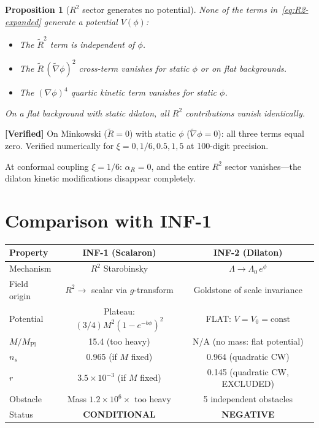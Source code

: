 \documentclass[11pt,a4paper]{article}
\theoremstyle{plain}
\newtheorem{proposition}[theorem]{Proposition}
\theoremstyle{definition}
\newcommand{\verified}[1]{%
  \par\smallskip\noindent
  \colorbox{green!10}{\parbox{\dimexpr\linewidth-2\fboxsep}{%
    \textcolor{green!50!black}{\textbf{[Verified]}} #1}}%
  \par\smallskip}
\begin{document}
\begin{proposition}[$R^2$ sector generates no potential]\label{prop:R2-no-V}
None of the terms in~\eqref{eq:R2-expanded} generate a potential
$V(\phi)$:
\begin{itemize}[nosep]
  \item The $\tilde{R}^2$ term is independent of $\phi$.
  \item The $\tilde{R}\,(\tilde{\nabla}\phi)^2$ cross-term vanishes
    for static $\phi$ or on flat backgrounds.
  \item The $(\nabla\phi)^4$ quartic kinetic term vanishes for
    static $\phi$.
\end{itemize}
On a flat background with static dilaton, all $R^2$ contributions
vanish identically.
\end{proposition}

\verified{On Minkowski ($\tilde{R} = 0$) with static $\phi$
($\tilde{\nabla}\phi = 0$): all three terms equal zero.  Verified
numerically for $\xi = 0, 1/6, 0.5, 1, 5$ at 100-digit precision.}

At conformal coupling $\xi = 1/6$: $\alpha_R = 0$, and the entire
$R^2$ sector vanishes---the dilaton kinetic modifications disappear
completely.

\section{Comparison with INF-1}\label{sec:comparison}

\begin{center}
\begin{tabular}{lcc}
\toprule
Property & INF-1 (Scalaron) & INF-2 (Dilaton) \\
\midrule
Mechanism & $R^2$ Starobinsky & $\Lambda \to \Lambda_0\,e^\phi$ \\
Field origin & $R^2 \to$ scalar via $g$-transform
  & Goldstone of scale invariance \\
Potential & Plateau: $(3/4)M^2(1-e^{-b\phi})^2$
  & FLAT: $V = V_0 = \mathrm{const}$ \\
$M/M_{\mathrm{Pl}}$ & 15.4 (too heavy)
  & N/A (no mass: flat potential) \\
$n_s$ & 0.965 (if $M$ fixed)
  & 0.964 (quadratic CW) \\
$r$ & $3.5 \times 10^{-3}$ (if $M$ fixed)
  & 0.145 (quadratic CW, EXCLUDED) \\
Obstacle & Mass $1.2 \times 10^6 \times$ too heavy
  & 5 independent obstacles \\
Status & \textbf{CONDITIONAL} & \textbf{NEGATIVE} \\
\bottomrule
\end{tabular}
\end{center}
\end{document}
